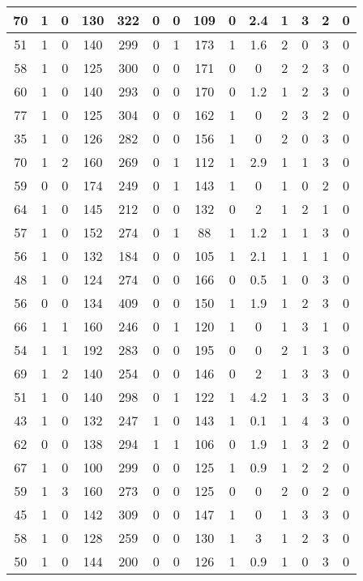 \documentclass{article}
\begin{document}
\begin{longtable}{|c|c|c|c|c|c|c|c|c|c|c|c|c|c|}
70 & 1 & 0 & 130 & 322 & 0 & 0 & 109 & 0 & 2.4 & 1 & 3 & 2 & 0 \\ \hline
51 & 1 & 0 & 140 & 299 & 0 & 1 & 173 & 1 & 1.6 & 2 & 0 & 3 & 0 \\ \hline
58 & 1 & 0 & 125 & 300 & 0 & 0 & 171 & 0 & 0 & 2 & 2 & 3 & 0 \\ \hline
60 & 1 & 0 & 140 & 293 & 0 & 0 & 170 & 0 & 1.2 & 1 & 2 & 3 & 0 \\ \hline
77 & 1 & 0 & 125 & 304 & 0 & 0 & 162 & 1 & 0 & 2 & 3 & 2 & 0 \\ \hline
35 & 1 & 0 & 126 & 282 & 0 & 0 & 156 & 1 & 0 & 2 & 0 & 3 & 0 \\ \hline
70 & 1 & 2 & 160 & 269 & 0 & 1 & 112 & 1 & 2.9 & 1 & 1 & 3 & 0 \\ \hline
59 & 0 & 0 & 174 & 249 & 0 & 1 & 143 & 1 & 0 & 1 & 0 & 2 & 0 \\ \hline
64 & 1 & 0 & 145 & 212 & 0 & 0 & 132 & 0 & 2 & 1 & 2 & 1 & 0 \\ \hline
57 & 1 & 0 & 152 & 274 & 0 & 1 & 88 & 1 & 1.2 & 1 & 1 & 3 & 0 \\ \hline
56 & 1 & 0 & 132 & 184 & 0 & 0 & 105 & 1 & 2.1 & 1 & 1 & 1 & 0 \\ \hline
48 & 1 & 0 & 124 & 274 & 0 & 0 & 166 & 0 & 0.5 & 1 & 0 & 3 & 0 \\ \hline
56 & 0 & 0 & 134 & 409 & 0 & 0 & 150 & 1 & 1.9 & 1 & 2 & 3 & 0 \\ \hline
66 & 1 & 1 & 160 & 246 & 0 & 1 & 120 & 1 & 0 & 1 & 3 & 1 & 0 \\ \hline
54 & 1 & 1 & 192 & 283 & 0 & 0 & 195 & 0 & 0 & 2 & 1 & 3 & 0 \\ \hline
69 & 1 & 2 & 140 & 254 & 0 & 0 & 146 & 0 & 2 & 1 & 3 & 3 & 0 \\ \hline
51 & 1 & 0 & 140 & 298 & 0 & 1 & 122 & 1 & 4.2 & 1 & 3 & 3 & 0 \\ \hline
43 & 1 & 0 & 132 & 247 & 1 & 0 & 143 & 1 & 0.1 & 1 & 4 & 3 & 0 \\ \hline
62 & 0 & 0 & 138 & 294 & 1 & 1 & 106 & 0 & 1.9 & 1 & 3 & 2 & 0 \\ \hline
67 & 1 & 0 & 100 & 299 & 0 & 0 & 125 & 1 & 0.9 & 1 & 2 & 2 & 0 \\ \hline
59 & 1 & 3 & 160 & 273 & 0 & 0 & 125 & 0 & 0 & 2 & 0 & 2 & 0 \\ \hline
45 & 1 & 0 & 142 & 309 & 0 & 0 & 147 & 1 & 0 & 1 & 3 & 3 & 0 \\ \hline
58 & 1 & 0 & 128 & 259 & 0 & 0 & 130 & 1 & 3 & 1 & 2 & 3 & 0 \\ \hline
50 & 1 & 0 & 144 & 200 & 0 & 0 & 126 & 1 & 0.9 & 1 & 0 & 3 & 0 \\ \hline

\end{longtable}
\end{document}
